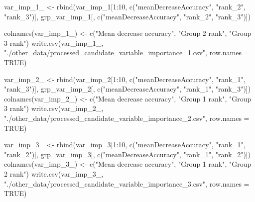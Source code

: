 \documentclass[
  11pt,
  oneside]{book}
\newenvironment{Shaded}{\begin{snugshade}}{\end{snugshade}}
\newcommand{\AttributeTok}[1]{\textcolor[rgb]{0.77,0.63,0.00}{#1}}
\newcommand{\ConstantTok}[1]{\textcolor[rgb]{0.00,0.00,0.00}{#1}}
\newcommand{\DecValTok}[1]{\textcolor[rgb]{0.00,0.00,0.81}{#1}}
\newcommand{\FunctionTok}[1]{\textcolor[rgb]{0.00,0.00,0.00}{#1}}
\newcommand{\NormalTok}[1]{#1}
\newcommand{\OtherTok}[1]{\textcolor[rgb]{0.56,0.35,0.01}{#1}}
\newcommand{\SpecialCharTok}[1]{\textcolor[rgb]{0.00,0.00,0.00}{#1}}
\newcommand{\StringTok}[1]{\textcolor[rgb]{0.31,0.60,0.02}{#1}}
\begin{document}
\begin{Shaded}
\begin{Highlighting}[]
\NormalTok{var\_imp\_1\_ }\OtherTok{\textless{}{-}} \FunctionTok{rbind}\NormalTok{(var\_imp\_1[}\DecValTok{1}\SpecialCharTok{:}\DecValTok{10}\NormalTok{, }\FunctionTok{c}\NormalTok{(}\StringTok{"meanDecreaseAccuracy"}\NormalTok{, }\StringTok{"rank\_2"}\NormalTok{, }\StringTok{"rank\_3"}\NormalTok{)], grp\_var\_imp\_1[, }\FunctionTok{c}\NormalTok{(}\StringTok{"meanDecreaseAccuracy"}\NormalTok{, }\StringTok{"rank\_2"}\NormalTok{, }\StringTok{"rank\_3"}\NormalTok{)])}

\FunctionTok{colnames}\NormalTok{(var\_imp\_1\_) }\OtherTok{\textless{}{-}} \FunctionTok{c}\NormalTok{(}\StringTok{"Mean decrease accuracy"}\NormalTok{, }\StringTok{"Group 2 rank"}\NormalTok{, }\StringTok{"Group 3 rank"}\NormalTok{)}
\FunctionTok{write.csv}\NormalTok{(var\_imp\_1\_, }\StringTok{"./other\_data/processed\_candidate\_variable\_importance\_1.csv"}\NormalTok{, }\AttributeTok{row.names =} \ConstantTok{TRUE}\NormalTok{)}

\NormalTok{var\_imp\_2\_ }\OtherTok{\textless{}{-}} \FunctionTok{rbind}\NormalTok{(var\_imp\_2[}\DecValTok{1}\SpecialCharTok{:}\DecValTok{10}\NormalTok{, }\FunctionTok{c}\NormalTok{(}\StringTok{"meanDecreaseAccuracy"}\NormalTok{, }\StringTok{"rank\_1"}\NormalTok{, }\StringTok{"rank\_3"}\NormalTok{)], grp\_var\_imp\_2[, }\FunctionTok{c}\NormalTok{(}\StringTok{"meanDecreaseAccuracy"}\NormalTok{, }\StringTok{"rank\_1"}\NormalTok{, }\StringTok{"rank\_3"}\NormalTok{)])}
\FunctionTok{colnames}\NormalTok{(var\_imp\_2\_) }\OtherTok{\textless{}{-}} \FunctionTok{c}\NormalTok{(}\StringTok{"Mean decrease accuracy"}\NormalTok{, }\StringTok{"Group 1 rank"}\NormalTok{, }\StringTok{"Group 3 rank"}\NormalTok{)}
\FunctionTok{write.csv}\NormalTok{(var\_imp\_2\_, }\StringTok{"./other\_data/processed\_candidate\_variable\_importance\_2.csv"}\NormalTok{, }\AttributeTok{row.names =} \ConstantTok{TRUE}\NormalTok{)}

\NormalTok{var\_imp\_3\_ }\OtherTok{\textless{}{-}} \FunctionTok{rbind}\NormalTok{(var\_imp\_3[}\DecValTok{1}\SpecialCharTok{:}\DecValTok{10}\NormalTok{, }\FunctionTok{c}\NormalTok{(}\StringTok{"meanDecreaseAccuracy"}\NormalTok{, }\StringTok{"rank\_1"}\NormalTok{, }\StringTok{"rank\_2"}\NormalTok{)], grp\_var\_imp\_3[, }\FunctionTok{c}\NormalTok{(}\StringTok{"meanDecreaseAccuracy"}\NormalTok{, }\StringTok{"rank\_1"}\NormalTok{, }\StringTok{"rank\_2"}\NormalTok{)])}
\FunctionTok{colnames}\NormalTok{(var\_imp\_3\_) }\OtherTok{\textless{}{-}} \FunctionTok{c}\NormalTok{(}\StringTok{"Mean decrease accuracy"}\NormalTok{, }\StringTok{"Group 1 rank"}\NormalTok{, }\StringTok{"Group 2 rank"}\NormalTok{)}
\FunctionTok{write.csv}\NormalTok{(var\_imp\_3\_, }\StringTok{"./other\_data/processed\_candidate\_variable\_importance\_3.csv"}\NormalTok{, }\AttributeTok{row.names =} \ConstantTok{TRUE}\NormalTok{)}
\end{Highlighting}
\end{Shaded}
\end{document}
